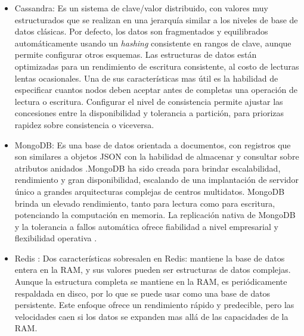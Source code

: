 \begin{itemize}
\item Cassandra: Es un sistema de clave/valor distribuido, con valores muy estructurados que se realizan en una
jerarquía similar a los niveles de base de datos clásicas. Por defecto, los datos son fragmentados y equilibrados
automáticamente usando un \emph{hashing} consistente en rangos de clave, aunque permite configurar otros esquemas. \cite{dataglossary}
 Las estructuras de datos están optimizadas para un rendimiento de escritura consistente, al costo de lecturas lentas ocasionales. Una de sus características mas útil es la habilidad de especificar cuantos nodos deben aceptar antes de completas una operación de lectura o escritura. Configurar el nivel de consistencia permite ajustar las concesiones entre la disponibilidad y tolerancia a partición, para priorizas rapidez sobre consistencia o viceversa.\cite{dataglossary}

\item MongoDB: Es una base de datos orientada a documentos, con registros que son similares a objetos JSON con la habilidad de almacenar y consultar sobre atributos anidados \cite{dataglossary}.MongoDB ha sido creada para brindar escalabilidad, rendimiento y gran disponibilidad,
escalando de una implantación de servidor único a grandes arquitecturas complejas de centros multidatos. MongoDB brinda un elevado rendimiento, tanto para lectura como para escritura, potenciando la computación en memoria. La replicación nativa de MongoDB y la
tolerancia a fallos automática ofrece fiabilidad a nivel empresarial y flexibilidad operativa \cite{mongo}.

\item Redis : Dos características sobresalen en Redis: mantiene la base de datos entera en la RAM, y sus valores pueden ser estructuras de datos complejas. Aunque la estructura completa se mantiene en la RAM, es periódicamente respaldada en disco, por lo que se puede usar como una base de datos persistente. Este enfoque ofrece un rendimiento rápido y predecible, pero las velocidades caen si los datos se expanden mas allá de las capacidades de la RAM.\cite{dataglossary}

 \cite{11-josemy}
\end{itemize}

